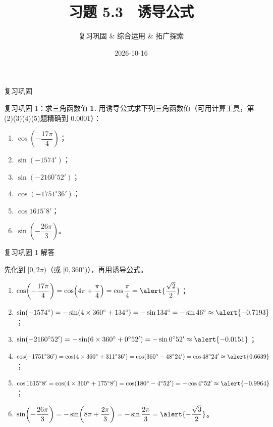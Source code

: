 \documentclass[10pt,aspectratio=169,serif]{beamer}
\title[习题5.3]{习题 5.3　诱导公式}
\subtitle{复习巩固 \& 综合运用 \& 拓广探索}
\author{}
\institute{}
\date{2026-10-16}
\begin{document}
\begin{frame}
  \titlepage
\end{frame}

\begin{frame}[c]\Huge\centering 复习巩固\end{frame}

\begin{frame}[t]{复习巩固 1：求三角函数值}
\textbf{1.} 用诱导公式求下列三角函数值（可用计算工具，第(2)(3)(4)(5)题精确到 $0.0001$）：
\begin{enumerate}[(1)]
  \item $\cos\!\left(-\dfrac{17\pi}{4}\right)$； \qquad
  \item $\sin(-1574^\circ)$； \qquad
  \item $\sin(-2160^\circ52')$；
  \item $\cos(-1751^\circ36')$； \qquad
  \item $\cos 1615^\circ8'$； \qquad
  \item $\sin\!\left(-\dfrac{26\pi}{3}\right)$。
\end{enumerate}
\end{frame}

\begin{frame}[t]{复习巩固 1 解答}
\begin{tcolorbox}[colback=orange!10,colframe=orange,title=\textbf{解}]
先化到 $[0,2\pi)$（或 $[0,360^\circ)$），再用诱导公式。
\begin{enumerate}[(1)]
  \item $\cos\!\left(-\dfrac{17\pi}{4}\right)=\cos\!\left(4\pi+\dfrac{\pi}{4}\right)=\cos\dfrac{\pi}{4}=\alert{\dfrac{\sqrt2}{2}}$；
  \item $\sin(-1574^\circ)=-\sin(4\times360^\circ+134^\circ)=-\sin134^\circ=-\sin46^\circ\approx\alert{-0.7193}$；
  \item $\sin(-2160^\circ52')=-\sin(6\times360^\circ+0^\circ52')=-\sin0^\circ52'\approx\alert{-0.0151}$；
  \item $\cos(-1751^\circ36')=\cos(4\times360^\circ+311^\circ36')=\cos(360^\circ-48^\circ24')=\cos48^\circ24'\approx\alert{0.6639}$；
  \item $\cos1615^\circ8'=\cos(4\times360^\circ+175^\circ8')=\cos(180^\circ-4^\circ52')=-\cos4^\circ52'\approx\alert{-0.9964}$；
  \item $\sin\!\left(-\dfrac{26\pi}{3}\right)=-\sin\!\left(8\pi+\dfrac{2\pi}{3}\right)=-\sin\dfrac{2\pi}{3}=\alert{-\dfrac{\sqrt3}{2}}$。
\end{enumerate}
\end{tcolorbox}
\end{frame}
\end{document}
